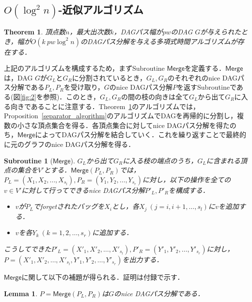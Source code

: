 \documentclass[master]{kuisthesis}		%
\theoremstyle{plain}
\newtheorem{theorem}{Theorem}
\newtheorem{subroutine}{Subroutine}
\newtheorem{lemma}{Lemma}
\theoremstyle{definition}
\begin{document}
\subsection{$O(\log ^2 n)$-近似アルゴリズム}

\begin{theorem}\label{approximation}
    頂点数$n$，最大出次数$k$，DAGパス幅が$pw$のDAG $G$が与えられたとき，幅が$O(k \ pw \log ^2 n)$のDAGパス分解を与える多項式時間アルゴリズムが存在する．
\end{theorem}


上記のアルゴリズムを構成するため，まずSubroutine $\mathsf{Merge}$を定義する．$\mathsf{Merge}$は，DAG $G$が$G_L$と$G_R$に分割されているとき，$G_L, G_R$のそれぞれのnice DAGパス分解である$P_L, P_R$を受け取り，$G$のnice DAGパス分解$P$を返すSubroutineである(図\ref{fig:2}を参照)．このとき，$G_L, G_R$の間の枝の向きは全て$G_L$から出て$G_R$に入る向きであることに注意する．Theorem~\ref{approximation}のアルゴリズムでは，Proposition~\ref{separator_algorithm}のアルゴリズムでDAGを再帰的に分割し，複数の小さな頂点集合を得る．各頂点集合に対してnice DAGパス分解を得たのち，$\mathsf{Merge}$によってDAGパス分解を結合していく．これを繰り返すことで最終的に元のグラフのnice DAGパス分解を得る．


\begin{subroutine}[$\mathsf{Merge}$]
    $G_L$から出て$G_R$に入る枝の端点のうち，$G_L$に含まれる頂点の集合を$V'$とする．$\mathsf{Merge}(P_L, P_R)$では，$P_L=(X_1, X_2, \dots , X_{s_l}), P_R=(Y_1, Y_2, \dots , Y_{s_r})$に対し，以下の操作を全ての$v \in V'$に対して行ってできるnice DAGパス分解$P'_L, P'_R$を構成する．
    \begin{itemize}
      \item $v$が$P_L$でforgetされたバッグを$X_i$とし，各$X_j\ (j=i, i+1, \dots , s_l)$に$v$を追加する．
      \item $v$を各$Y_k\ (k=1, 2, \dots , s_r)$に追加する．
    \end{itemize}
    こうしてできた$P'_L=(X'_1, X'_2, \dots , X'_{s_l}), P'_R=(Y'_1, Y'_2, \dots , Y'_{s_r})$に対し，$P=(X'_1, X'_2, \dots , X'_{s_l}, Y'_1, Y'_2, \dots , Y'_{s_r})$を出力する．
\end{subroutine}

$\mathsf{Merge}$に関して以下の補題が得られる．証明は付録で示す．

\begin{lemma}\label{lemma_Merge}
    $P=\mathsf{Merge}(P_L, P_R)$は$G$のnice DAGパス分解である．
\end{lemma}
\end{document}
